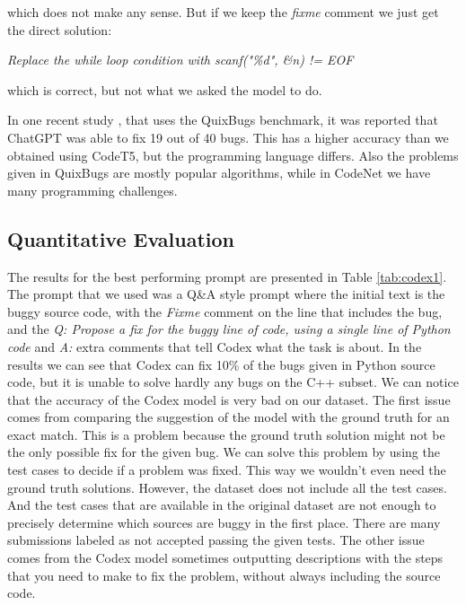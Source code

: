 \documentclass[12pt,a4paper]{report}
\begin{document}
which does not make any sense. But if we keep the \textit{fixme} comment we just get the direct solution:

 \textit{Replace the while loop condition with scanf("\%d", \&n) != EOF}

 which is correct, but not what we asked the model to do.

 In one recent study \cite{https://doi.org/10.48550/arxiv.2301.08653}, that uses the QuixBugs \cite{10.1145/3135932.3135941} benchmark, it was reported that ChatGPT was able to fix 19 out of 40 bugs. This has a higher accuracy than we obtained using CodeT5, but the programming language differs. Also the problems given in QuixBugs are mostly popular algorithms, while in CodeNet we have many programming challenges.

\subsection{Quantitative Evaluation}

The results for the best performing prompt are presented in Table \ref{tab:codex1}. The prompt that we used was a Q\&A style prompt where the initial text is the buggy source code, with the \textit{Fixme} comment on the line that includes the bug, and the \textit{Q: Propose a fix for the buggy line of code, using a single line of Python code} and \textit{A:} extra comments that tell Codex what the task is about. In the results we can see that Codex can fix 10\% of the bugs given in Python source code, but it is unable to solve hardly any bugs on the C++ subset. We can notice that the accuracy of the Codex model is very bad on our dataset. The first issue comes from comparing the suggestion of the model with the ground truth for an exact match. This is a problem because the ground truth solution might not be the only possible fix for the given bug. We can solve this problem by using the test cases to decide if a problem was fixed. This way we wouldn't even need the ground truth solutions. However, the dataset does not include all the test cases. And the test cases that are available in the original dataset are not enough to precisely determine which sources are buggy in the first place. There are many submissions labeled as not accepted passing the given tests. The other issue comes from the Codex model sometimes outputting descriptions with the steps that you need to make to fix the problem, without always including the source code.
\end{document}
